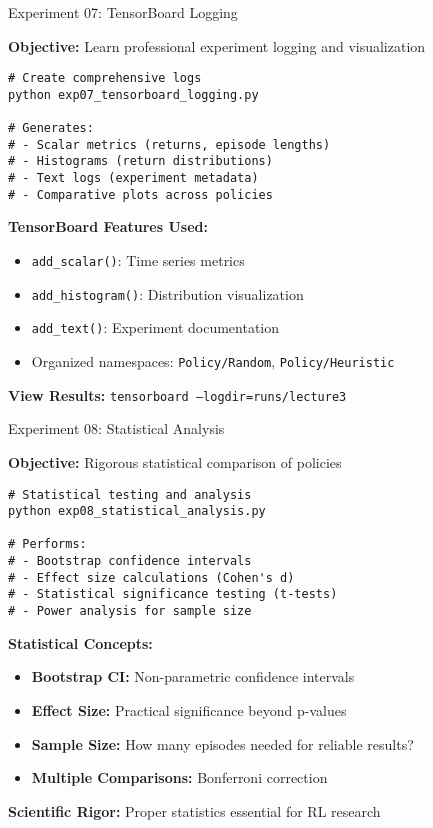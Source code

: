 \documentclass[aspectratio=169,10pt]{beamer}
\begin{document}
\begin{frame}[fragile]{Experiment 07: TensorBoard Logging}

\textbf{Objective:} Learn professional experiment logging and visualization

\begin{lstlisting}
# Create comprehensive logs
python exp07_tensorboard_logging.py

# Generates:
# - Scalar metrics (returns, episode lengths)
# - Histograms (return distributions) 
# - Text logs (experiment metadata)
# - Comparative plots across policies
\end{lstlisting}

\vfill

\textbf{TensorBoard Features Used:}
\begin{itemize}
    \item \texttt{add\_scalar()}: Time series metrics
    \item \texttt{add\_histogram()}: Distribution visualization
    \item \texttt{add\_text()}: Experiment documentation
    \item Organized namespaces: \texttt{Policy/Random}, \texttt{Policy/Heuristic}
\end{itemize}

\vfill

\textbf{View Results:} \texttt{tensorboard --logdir=runs/lecture3}

\end{frame}

\begin{frame}[fragile]{Experiment 08: Statistical Analysis}

\textbf{Objective:} Rigorous statistical comparison of policies

\begin{lstlisting}
# Statistical testing and analysis
python exp08_statistical_analysis.py

# Performs:
# - Bootstrap confidence intervals
# - Effect size calculations (Cohen's d)
# - Statistical significance testing (t-tests)
# - Power analysis for sample size
\end{lstlisting}

\vfill

\textbf{Statistical Concepts:}
\begin{itemize}
    \item \textbf{Bootstrap CI:} Non-parametric confidence intervals
    \item \textbf{Effect Size:} Practical significance beyond p-values
    \item \textbf{Sample Size:} How many episodes needed for reliable results?
    \item \textbf{Multiple Comparisons:} Bonferroni correction
\end{itemize}

\vfill

\textbf{Scientific Rigor:} Proper statistics essential for RL research

\end{frame}
\end{document}
